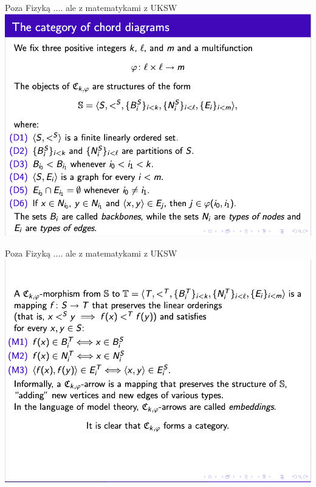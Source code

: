 \documentclass{beamer}
\begin{document}
\begin{frame}{Poza Fizyką .... ale z matematykami z UKSW}
\includegraphics[scale=0.35]{zd1}
\end{frame}

\begin{frame}{Poza Fizyką .... ale z matematykami z UKSW}
\includegraphics[scale=0.35]{zd2}
\end{frame}
\end{document}
